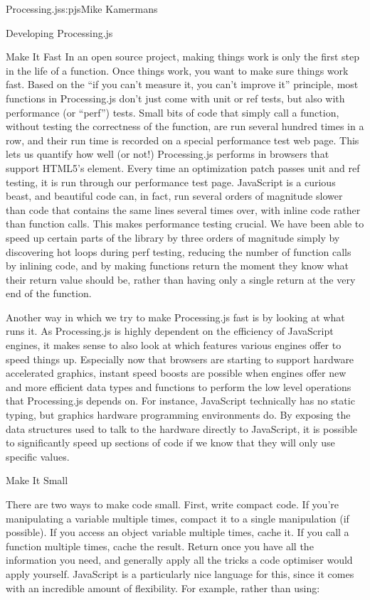 \begin{aosachapter}{Processing.js}{s:pjs}{Mike Kamermans}
\begin{aosasect1}{Developing Processing.js}
\begin{aosasect2}{Make It Fast}
In an open source project, making things work is only the first step
in the life of a function. Once things work, you want to make sure
things work fast. Based on the ``if you can't measure it, you can't
improve it'' principle, most functions in Processing.js don't just come
with unit or ref tests, but also with performance (or ``perf'')
tests. Small bits of code that simply call a function, without testing
the correctness of the function, are run several hundred times in a
row, and their run time is recorded on a special performance test web
page. This lets us quantify how well (or not!) Processing.js performs
in browsers that support HTML5's
 element. Every time an
optimization patch passes unit and ref testing, it is run through our
performance test page. JavaScript is a curious beast, and beautiful
code can, in fact, run several orders of magnitude slower than code
that contains the same lines several times over, with inline code
rather than function calls. This makes performance testing crucial. We
have been able to speed up certain parts of the library by three
orders of magnitude simply by discovering hot loops during perf
testing, reducing the number of function calls by inlining code, and
by making functions return the moment they know what their return
value should be, rather than having only a single return at the very
end of the function.

Another way in which we try to make Processing.js fast is by looking
at what runs it. As Processing.js is highly dependent on the
efficiency of JavaScript engines, it makes sense to also look at which
features various engines offer to speed things up. Especially now that
browsers are starting to support hardware accelerated graphics,
instant speed boosts are possible when engines offer new and more
efficient data types and functions to perform the low level operations that
Processing.js depends on. For instance, JavaScript technically has no
static typing, but graphics hardware programming environments do. By
exposing the data structures used to talk to the hardware directly to
JavaScript, it is possible to significantly speed up sections of code
if we know that they will only use specific values.

\end{aosasect2}

\begin{aosasect2}{Make It Small}

There are two ways to make code small. First, write compact code. If
you're manipulating a variable multiple times, compact it to a single
manipulation (if possible). If you access an object variable multiple
times, cache it. If you call a function multiple times, cache the
result. Return once you have all the information you need, and
generally apply all the tricks a code optimiser would apply
yourself. JavaScript is a particularly nice language for this, since
it comes with an incredible amount of flexibility. For example, rather
than using:


\end{aosasect2}
\end{aosasect1}
\end{aosachapter}
